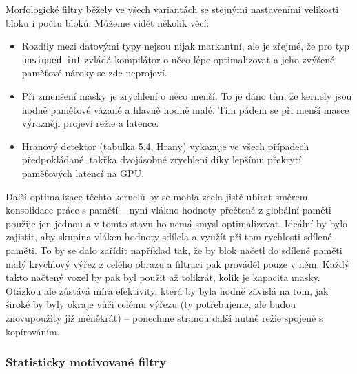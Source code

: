     Morfologické filtry běžely ve všech variantách se stejnými nastaveními velikosti bloku i počtu bloků. Můžeme vidět několik věcí:
    \begin{itemize}
      \item Rozdíly mezi datovými typy nejsou nijak markantní, ale je zřejmé, že pro typ {\tt unsigned int} zvládá kompilátor o něco lépe optimalizovat a jeho zvýšené paměťové nároky se zde neprojeví.
      \item Při zmenšení masky je zrychlení o něco menší. To je dáno tím, že kernely jsou hodně paměťové vázané a hlavně hodně malé. Tím pádem se při menší masce výrazněji projeví režie a latence.
      \item Hranový detektor (tabulka 5.4, Hrany) vykazuje ve všech případech předpokládané, takřka dvojásobné zrychlení díky lepšímu překrytí paměťových latencí na GPU.
    \end{itemize}

    Další optimalizace těchto kernelů by se mohla zcela jistě ubírat směrem konsolidace práce s pamětí -- nyní vlákno hodnoty přečtené z globální paměti použije jen jednou a v tomto stavu ho nemá smysl optimalizovat. Ideální by bylo zajistit, aby skupina vláken hodnoty sdílela a využít při tom rychlosti sdílené paměti. To by se dalo zařídit například tak, že by blok načetl do sdílené paměti malý krychlový výřez z celého obrazu a filtraci pak prováděl pouze v něm. Každý takto načtený voxel by pak byl použit až tolikrát, kolik je kapacita masky. Otázkou ale zůstává míra efektivity, která by byla hodně závislá na tom, jak široké by byly okraje vůči celému výřezu (ty potřebujeme, ale budou znovupoužity již méněkrát) -- ponechme stranou další nutné režie spojené s kopírováním.
    
    \subsubsection{Statisticky motivované filtry}


